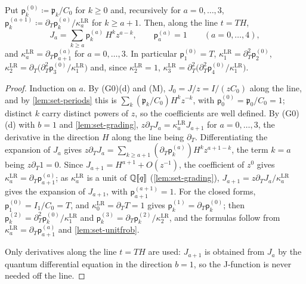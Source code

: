 \begin{lem}
\label{lem:set-birkhoff}
Put $\mathsf p^{(0)}_k\coloneqq\mathfrak p_k/C_0$ for $k\geq0$ and, recursively for $a=0,\dots,3$, $\mathsf p^{(a+1)}_k\coloneqq\partial_T\mathsf p^{(a)}_k/\kappa^{\mathrm{LR}}_a$ for $k\geq a+1$. Then, along the line $t=TH$,
\[
J_a=\sum_{k\geq a}\mathsf p^{(a)}_k\,H^kz^{a-k},\qquad\mathsf p^{(a)}_a=1\qquad(a=0,\dots,4),
\]
and $\kappa^{\mathrm{LR}}_a=\partial_T\mathsf p^{(a)}_{a+1}$ for $a=0,\dots,3$. In particular $\mathsf p^{(0)}_1=T$, $\kappa^{\mathrm{LR}}_1=\partial_T^2\mathsf p^{(0)}_2$, $\kappa^{\mathrm{LR}}_2=\partial_T\bigl(\partial_T^2\mathsf p^{(0)}_3/\kappa^{\mathrm{LR}}_1\bigr)$ and, since $\kappa^{\mathrm{LR}}_2=1$, $\kappa^{\mathrm{LR}}_3=\partial_T^2\bigl(\partial_T^2\mathsf p^{(0)}_4/\kappa^{\mathrm{LR}}_1\bigr)$.
\end{lem}

\begin{proof}
Induction on $a$. By (G0)(d) and (M), $J_0=J/z=I/(zC_0)$ along the line, and by \cref{lem:set-periods} this is $\sum_k(\mathfrak p_k/C_0)H^kz^{-k}$, with $\mathsf p^{(0)}_0=\mathfrak p_0/C_0=1$; distinct $k$ carry distinct powers of $z$, so the coefficients are well defined. By (G0)(d) with $b=1$ and \cref{lem:set-grading}, $z\partial_TJ_a=\kappa^{\mathrm{LR}}_aJ_{a+1}$ for $a=0,\dots,3$, the derivative in the direction $H$ along the line being $\partial_T$. Differentiating the expansion of $J_a$ gives $z\partial_TJ_a=\sum_{k\geq a+1}(\partial_T\mathsf p^{(a)}_k)H^kz^{a+1-k}$, the term $k=a$ being $z\partial_T1=0$. Since $J_{a+1}=H^{a+1}+O(z^{-1})$, the coefficient of $z^0$ gives $\kappa^{\mathrm{LR}}_a=\partial_T\mathsf p^{(a)}_{a+1}$; as $\kappa^{\mathrm{LR}}_a$ is a unit of $\mathbb{Q}[\![ q ]\!]$ (\cref{lem:set-grading}), $J_{a+1}=z\partial_TJ_a/\kappa^{\mathrm{LR}}_a$ gives the expansion of $J_{a+1}$, with $\mathsf p^{(a+1)}_{a+1}=1$. For the closed forms, $\mathsf p^{(0)}_1=I_1/C_0=T$, and $\kappa^{\mathrm{LR}}_0=\partial_TT=1$ gives $\mathsf p^{(1)}_k=\partial_T\mathsf p^{(0)}_k$; then $\mathsf p^{(2)}_k=\partial_T^2\mathsf p^{(0)}_k/\kappa^{\mathrm{LR}}_1$ and $\mathsf p^{(3)}_k=\partial_T\mathsf p^{(2)}_k/\kappa^{\mathrm{LR}}_2$, and the formulas follow from $\kappa^{\mathrm{LR}}_a=\partial_T\mathsf p^{(a)}_{a+1}$ and \cref{lem:set-unitfrob}.

Only derivatives along the line $t=TH$ are used: $J_{a+1}$ is obtained from $J_a$ by the quantum differential equation in the direction $b=1$, so the J-function is never needed off the line.
\end{proof}


